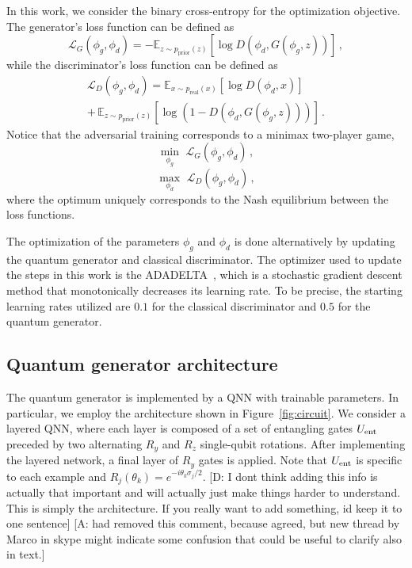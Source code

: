 \documentclass[twocolumn,preprintnumbers,superscriptaddress]{revtex4-2}
\newcommand{\commentAF}[1]{{\color{cyan} {[A: #1]}}}
\newcommand{\commentDMG}[1]{{\color{orange} {[D: #1]}}}
\begin{document}
In this work, we consider the binary cross-entropy for the optimization objective. The generator's loss function can be defined as
\begin{equation}
   \mathcal{L}_G(\phi_g,\phi_d) = -\mathbb{E}_{z \sim p_{\mathrm{prior}}(z)}[\log D(\phi_d,G(\phi_g,z))]  \,,
\end{equation}
while the discriminator's loss function can be defined as
\begin{equation}
\begin{split}
   \mathcal{L}_D(\phi_g,\phi_d) = \mathbb{E}_{x \sim p_{\mathrm{real}}(x)}[\log D(\phi_d,x)] \\+\, \mathbb{E}_{z \sim p_{\mathrm{prior}}(z)}[\log (1-D(\phi_d,G(\phi_g,z)))]\,.
\end{split}
\end{equation}
Notice that the adversarial training corresponds to a minimax two-player game,
\begin{equation}
 \underset{\phi_g}{\min}\,\,\mathcal{L}_G(\phi_g,\phi_d)  \,,
\end{equation}
\begin{equation}
 \underset{\phi_d}{\max}\,\,\mathcal{L}_D(\phi_g,\phi_d)  \,,
\end{equation}
where the optimum uniquely corresponds to the Nash equilibrium between the loss functions.

The optimization of the parameters $\phi_g$ and $\phi_d$ is done alternatively by updating the quantum generator and classical discriminator. The optimizer used to update the steps in this work is the ADADELTA~\cite{zeiler2012adadelta}, which is a stochastic gradient descent method that monotonically decreases its learning rate. To be precise, the starting learning rates utilized are $0.1$ for the classical discriminator and $0.5$ for the quantum generator.

\subsection{Quantum generator architecture}
The quantum generator is implemented by a QNN with trainable parameters. In particular, we employ the architecture shown in Figure~\ref{fig:circuit}. We consider a layered QNN, where each layer is composed of a set of entangling gates $U_{\rm ent}$ preceded by two alternating $R_y$ and $R_z$ single-qubit rotations. After implementing the layered network, a final layer of $R_y$ gates is applied. Note that $U_{\rm ent}$ is specific to each example and $R_j(\theta_k) = e^{-i\theta_k \sigma_j /2}$. \commentDMG{I dont think adding this info is actually that important and will actually just make things harder to understand. This is simply the architecture. If you really want to add something, id keep it to one sentence}\commentAF{had removed this comment, because agreed, but new thread by Marco in skype might indicate some confusion that could be useful to clarify also in text.}
\end{document}
